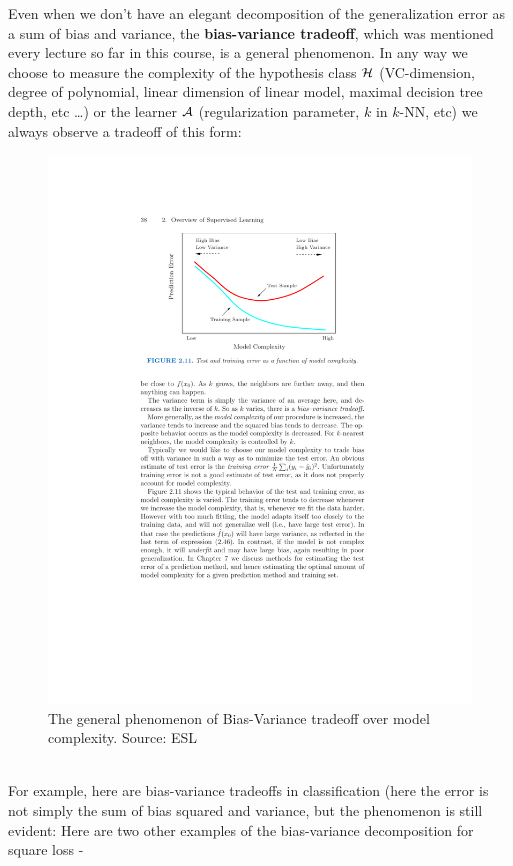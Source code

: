 Even when we don't have an elegant decomposition of the generalization error as
a sum of bias and variance, the {\bf bias-variance tradeoff}, which was 
mentioned every lecture so far in this course, is a general phenomenon. 
In any way we choose to measure the complexity of the hypothesis class $\mathcal{H}$
(VC-dimension, degree of polynomial, linear dimension of linear model, maximal
  decision tree
depth, etc \ldots) 
or
the learner $\mathcal{A}$  (regularization parameter, $k$ in $k$-NN, etc) we always
observe a tradeoff of this form:

\begin{figure}[H]
  \centering
  \includegraphics[width=4.5in]{ESL_bias_variance.pdf}
  \caption{The general phenomenon of Bias-Variance tradeoff over model
  complexity. Source: ESL}
\end{figure}
~\\
For example, here are bias-variance tradeoffs in classification (here the error
  is not simply the sum of bias squared and variance, but the phenomenon is
  still evident:
  Here are two other examples of the bias-variance decomposition for square loss - 
